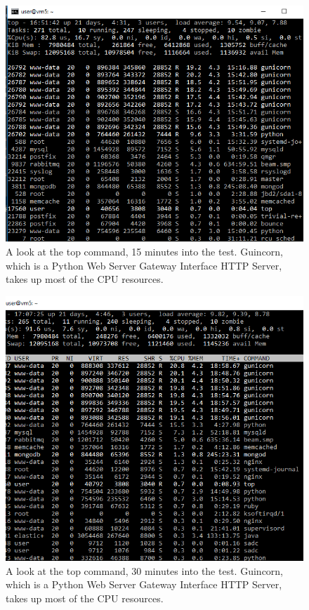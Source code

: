 \documentclass[12pt]{article}
\begin{document}
\newpage
\begin{figure}[h!]
	\centering
	\includegraphics[width=\textwidth,height=\textheight,keepaspectratio]{intro/S1.png}
	\caption{A look at the top command, 15 minutes into the test. Guincorn, which is a Python Web Server Gateway Interface HTTP Server, takes up most of the CPU resources.}
\end{figure}
\begin{figure}[h!]
	\centering
	\includegraphics[width=\textwidth,height=\textheight,keepaspectratio]{intro/S2.png}
	\caption{A look at the top command, 30 minutes into the test. Guincorn, which is a Python Web Server Gateway Interface HTTP Server, takes up most of the CPU resources. }
\end{figure}
\end{document}
